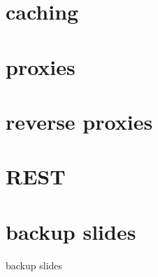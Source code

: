 \section{caching}


\section{proxies}

\section{reverse proxies}

\section{REST}


\section{backup slides}
\begin{frame}{backup slides}
\end{frame}


